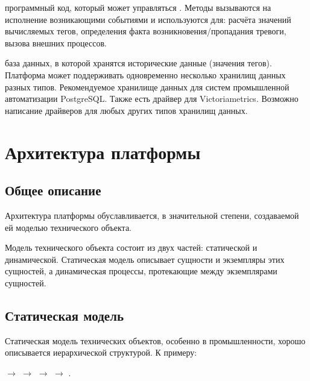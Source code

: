 \documentclass[a4paper,10pt,russian]{sphinxmanual}
\begin{document}
\sphinxAtStartPar
{} \sphinxhyphen{} программный код, который может управляться
.
Методы вызываются на исполнение возникающими событиями и используются для:
расчёта значений вычисляемых тегов, определения факта возникновения/пропадания
тревоги, вызова внешних процессов.

\sphinxAtStartPar
{} \sphinxhyphen{} база данных, в которой хранятся исторические данные
(значения тегов). Платформа может поддерживать одновременно несколько хранилищ
данных разных типов. Рекомендуемое хранилище данных для систем промышленной
автоматизации \sphinxhyphen{} PostgreSQL. Также есть драйвер для Victoriametrics. Возможно
написание драйверов для любых других типов хранилищ данных.

\sphinxstepscope


\chapter{Архитектура платформы}
\label{\detokenize{architecture:id1}}\label{\detokenize{architecture::doc}}

\section{Общее описание}
\label{\detokenize{architecture:id2}}
\sphinxAtStartPar
Архитектура платформы обуславливается, в значительной степени, создаваемой
ей моделью технического объекта.

\sphinxAtStartPar
Модель технического объекта состоит из двух частей: статической и динамической.
Статическая модель описывает сущности и экземпляры этих сущностей,
а динамическая \sphinxhyphen{} процессы, протекающие между экземплярами сущностей.


\section{Статическая модель}
\label{\detokenize{architecture:id3}}
\sphinxAtStartPar
Статическая модель технических объектов, особенно в промышленности, хорошо
описывается иерархической структурой. К примеру:

\sphinxAtStartPar
{} \(\rightarrow\)  \(\rightarrow\)  \(\rightarrow\)
 \(\rightarrow\) .
\end{document}
